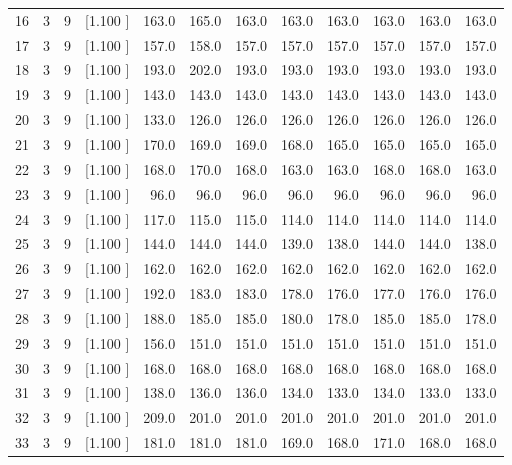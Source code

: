\documentclass[12pt,a4paper]{article}
\begin{document}
\begin{center}
{\begin{tabular}{r r r r r r r r r r r r}
  16&  3&  9&[1.100     ]&   163.0&   165.0&   163.0&   163.0&   163.0&   163.0&   163.0&   163.0\\[-0.02in]
  17&  3&  9&[1.100     ]&   157.0&   158.0&   157.0&   157.0&   157.0&   157.0&   157.0&   157.0\\[-0.02in]
  18&  3&  9&[1.100     ]&   193.0&   202.0&   193.0&   193.0&   193.0&   193.0&   193.0&   193.0\\[-0.02in]
  19&  3&  9&[1.100     ]&   143.0&   143.0&   143.0&   143.0&   143.0&   143.0&   143.0&   143.0\\[-0.02in]
  20&  3&  9&[1.100     ]&   133.0&   126.0&   126.0&   126.0&   126.0&   126.0&   126.0&   126.0\\[-0.02in]
  21&  3&  9&[1.100     ]&   170.0&   169.0&   169.0&   168.0&   165.0&   165.0&   165.0&   165.0\\[-0.02in]
  22&  3&  9&[1.100     ]&   168.0&   170.0&   168.0&   163.0&   163.0&   168.0&   168.0&   163.0\\[-0.02in]
  23&  3&  9&[1.100     ]&    96.0&    96.0&    96.0&    96.0&    96.0&    96.0&    96.0&    96.0\\[-0.02in]
  24&  3&  9&[1.100     ]&   117.0&   115.0&   115.0&   114.0&   114.0&   114.0&   114.0&   114.0\\[-0.02in]
  25&  3&  9&[1.100     ]&   144.0&   144.0&   144.0&   139.0&   138.0&   144.0&   144.0&   138.0\\[-0.02in]
  26&  3&  9&[1.100     ]&   162.0&   162.0&   162.0&   162.0&   162.0&   162.0&   162.0&   162.0\\[-0.02in]
  27&  3&  9&[1.100     ]&   192.0&   183.0&   183.0&   178.0&   176.0&   177.0&   176.0&   176.0\\[-0.02in]
  28&  3&  9&[1.100     ]&   188.0&   185.0&   185.0&   180.0&   178.0&   185.0&   185.0&   178.0\\[-0.02in]
  29&  3&  9&[1.100     ]&   156.0&   151.0&   151.0&   151.0&   151.0&   151.0&   151.0&   151.0\\[-0.02in]
  30&  3&  9&[1.100     ]&   168.0&   168.0&   168.0&   168.0&   168.0&   168.0&   168.0&   168.0\\[-0.02in]
  31&  3&  9&[1.100     ]&   138.0&   136.0&   136.0&   134.0&   133.0&   134.0&   133.0&   133.0\\[-0.02in]
  32&  3&  9&[1.100     ]&   209.0&   201.0&   201.0&   201.0&   201.0&   201.0&   201.0&   201.0\\[-0.02in]
  33&  3&  9&[1.100     ]&   181.0&   181.0&   181.0&   169.0&   168.0&   171.0&   168.0&   168.0\\[-0.02in]

\end{tabular}}
\end{center}
\end{document}
